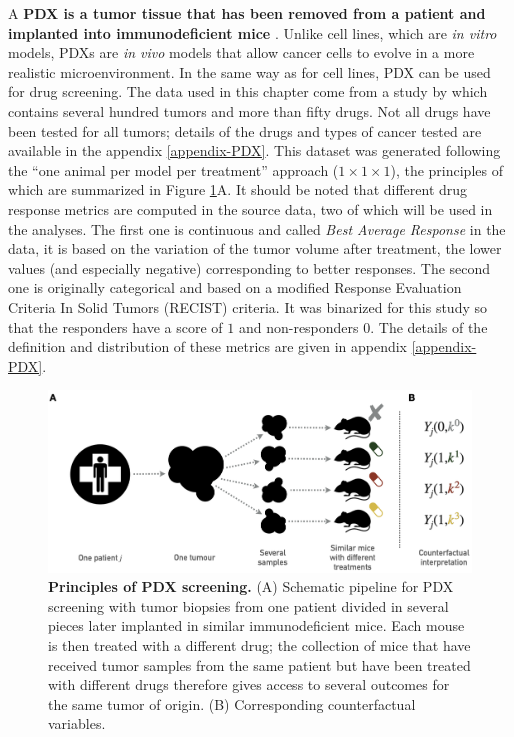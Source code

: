 \documentclass[a4paper,12pt,twoside,onecolumn,openright,final,oldfontcommands]{memoir}
\begin{document}
A \textbf{PDX is a tumor tissue that has been removed from a patient and
implanted into immunodeficient mice} \citep{hidalgo2014patient}. Unlike
cell lines, which are \emph{in vitro} models, PDXs are \emph{in vivo}
models that allow cancer cells to evolve in a more realistic
microenvironment. In the same way as for cell lines, PDX can be used for
drug screening. The data used in this chapter come from a study by
\citet{gao2015high} which contains several hundred tumors and more than
fifty drugs. Not all drugs have been tested for all tumors; details of
the drugs and types of cancer tested are available in the appendix
\ref{appendix-PDX}. This dataset was generated following the ``one
animal per model per treatment'' approach (\(1 \times 1 \times 1\)), the
principles of which are summarized in Figure \ref{fig:PDX-principles}A.
It should be noted that different drug response metrics are computed in
the source data, two of which will be used in the analyses. The first
one is continuous and called \emph{Best Average Response} in the data,
it is based on the variation of the tumor volume after treatment, the
lower values (and especially negative) corresponding to better
responses. The second one is originally categorical and based on a
modified Response Evaluation Criteria In Solid Tumors (RECIST) criteria.
It was binarized for this study so that the responders have a score of
\(1\) and non-responders \(0\). The details of the definition and
distribution of these metrics are given in appendix \ref{appendix-PDX}.

\begin{figure}

{\centering \includegraphics[width=0.9\linewidth]{fig/PDX} 

}

\caption[Principles of PDX screening]{\textbf{Principles of PDX screening.} (A)
Schematic pipeline for PDX screening with tumor biopsies from one
patient divided in several pieces later implanted in similar
immunodeficient mice. Each mouse is then treated with a different drug;
the collection of mice that have received tumor samples from the same
patient but have been treated with different drugs therefore gives
access to several outcomes for the same tumor of origin. (B)
Corresponding counterfactual variables.}\label{fig:PDX-principles}
\end{figure}
\end{document}
